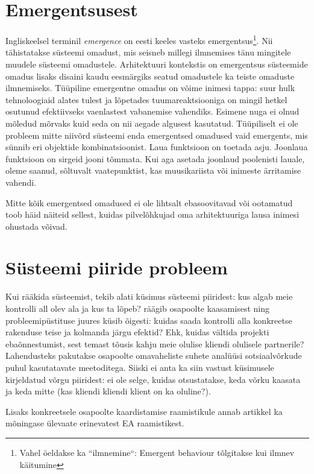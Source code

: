 \documentclass{tufte-book}
\begin{document}
\section{Emergentsusest}
Ingliskeelsel terminil \emph{emergence} on eesti keeles vasteks emergentsus\footnote{Vahel öeldakse ka ``ilmnemine``: Emergent behaviour tõlgitakse kui ilmnev käitumine}. Nii tähistatakse süsteemi omadust, mis seisneb millegi ilmnemises tänu mingitele muudele süsteemi omadustele. Arhitektuuri kontekstis on emergentsus süsteemide omadus lisaks disaini kaudu eesmärgiks seatud omadustele ka teiste omaduste ilmnemiseks. Tüüpiline emergentne omadus on võime inimesi tappa: suur hulk tehnoloogiaid alates tulest ja lõpetades tuumareaktsiooniga on mingil hetkel osutunud efektiivseks vaenlastest vabanemise vahendiks. Esimene nuga ei olnud mõledud mõrvaks kuid seda on nii aegade algusest kasutatud. Tüüpiliselt ei ole probleem mitte niivõrd süsteemi enda emergentsed omadused vaid emergents, mis sünnib eri objektide kombinatsioonist. Laua funktsioon on toetada asju. Joonlaua funktsioon on sirgeid jooni tõmmata. Kui aga asetada joonlaud poolenisti lauale, oleme saanud, sõltuvalt vaatepunktist, kas muusikariista või inimeste ärritamise vahendi. 

Mitte kõik emergentsed omadused ei ole lihtsalt ebasoovitavad või ootamatud \cite{emergence} toob häid näiteid sellest, kuidas pilvelõhkujad oma arhitektuuriga lausa inimesi ohustada võivad.

\section{Süsteemi piiride probleem}
\label{sec:boundary}
Kui rääkida süsteemist, tekib alati küsimus süsteemi piiridest: kus algab meie kontrolli all olev ala ja kus ta lõpeb? \cite{wood2013framework} räägib osapoolte kaasamisest ning probleemipüstituse juures küsib õigesti: kuidas saada kontrolli alla konkreetse rakenduse teise ja kolmanda järgu efektid? Ehk, kuidas vältida projekti ebaõnnestumist, sest temast tõusis kahju meie olulise kliendi olulisele partnerile? Lahendusteks pakutakse osapoolte omavaheliste suhete analüüsi sotsiaalvõrkude puhul kasutatavate meetoditega. Siiski ei anta ka siin vastust küsimusele kirjeldatud võrgu piiridest: ei ole selge, kuidas otsustatakse, keda võrku kaasata ja keda mitte (kas kliendi kliendi klient on ka oluline?). 

Lisaks konkreetsele osapoolte kaardistamise raamistikule annab artikkel ka mõningase ülevaate erinevatest EA raamistikest.
\end{document}
